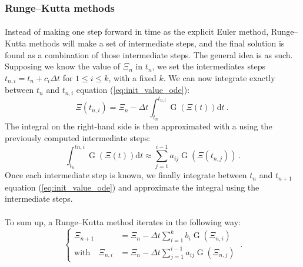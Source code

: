       \subsubsection{Runge--Kutta methods}

        \paragraph{}
        Instead of making one step forward in time as the explicit Euler method, Runge--Kutta methods will make a set of intermediate steps, and the final solution is found as a combination of those intermediate steps.
        The general idea is as such.
        Supposing we know the value of $\Xi_n$ in $t_n$, we set the intermediates steps $t_{n, i} = t_n + c_i\Delta t$ for $1 \leq i \leq k$, with a fixed $k$.
        We can now integrate exactly between $t_n$ and $t_{n, i}$ equation (\ref{eq:init_value_ode}):
        \begin{equation}
          \Xi\left(t_{n, i}\right) = \Xi_n - \Delta t \int_{t_n}^{t_{n,i}} \operatorname{G}\left(\Xi\left(t\right)\right) \mathrm{d}t\ .\
        \end{equation}
        The integral on the right-hand side is then approximated with a  using the previously computed intermediate steps:
        \begin{equation}
          \int_{t_n}^{t{n,i}} \operatorname{G}\left(\Xi\left(t\right)\right) \mathrm{d}t \approx \sum_{j = 1}^{i-1} a_{ij} \operatorname{G}\left(\Xi\left(t_{n,j}\right)\right) \ .
        \end{equation}
        Once each intermediate step is known, we finally integrate between $t_n$ and $t_{n+1}$ equation (\ref{eq:init_value_ode}) and approximate the integral using the intermediate steps.

        \paragraph{}
        To sum up, a Runge--Kutta method iterates in the following way:
        \begin{equation}
          \left\{\begin{aligned}
            \Xi_{n+1} &= \Xi_n - \Delta t \sum_{i = 1}^k b_i \operatorname{G}\left(\Xi_{n,i}\right) \\
            \textrm{with}\quad \Xi_{n,i} &= \Xi_n - \Delta t \sum_{j = 1}^{i-1} a_{ij} \operatorname{G}\left(\Xi_{n,j}\right)
          \end{aligned}\right. \ .
        \end{equation}

